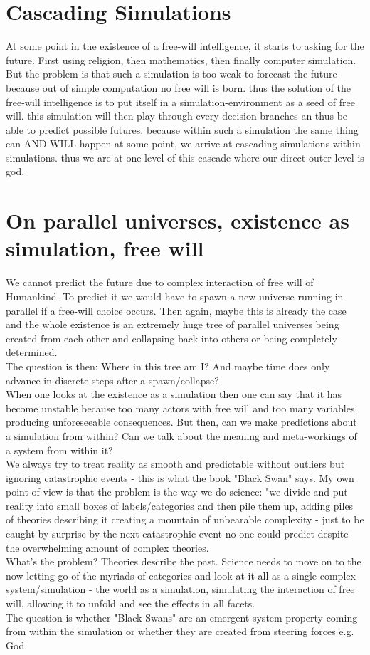 \documentclass{article}
\begin{document}
\section{Cascading Simulations}
At some point in the existence of a free-will intelligence, it starts to asking for the future. First using religion, then mathematics, then finally computer simulation. But the problem is that such a simulation is too weak to forecast the future because out of simple computation no free will is born. thus the solution of the free-will intelligence is to put itself in a simulation-environment as a seed of free will. this simulation will then play through every decision branches an thus be able to predict possible futures. because within such a simulation the same thing can AND WILL happen at some point, we arrive at cascading simulations within simulations. thus we are at one level of this cascade where our direct outer level is god.

\section{On parallel universes, existence as simulation, free will}
We cannot predict the future due to complex interaction of free will of Humankind. To predict it we would have to spawn a new universe running in parallel if a free-will choice occurs. Then again, maybe this is already the case and the whole existence is an extremely huge tree of parallel universes being created from each other and collapsing back into others or being completely determined. \\
The question is then: Where in this tree am I? And maybe time does only advance in discrete steps after a spawn/collapse? \\
When one looks at the existence as a simulation then one can say that it has become unstable because too many actors with free will and too many variables producing unforeseeable consequences. But then, can we make predictions about a simulation from within? Can we talk about the meaning and meta-workings of a system from within it? \\
We always try to treat reality as smooth and predictable without outliers but ignoring catastrophic events - this is what the book "Black Swan" says. My own point of view is that the problem is the way we do science: "we divide and put reality into small boxes of labels/categories and then pile them up, adding piles of theories describing it creating a mountain of unbearable complexity - just to be caught by surprise by the next catastrophic event no one could predict despite the overwhelming amount of complex theories. \\
What's the problem? Theories describe the past. Science needs to move on to the now letting go of the myriads of categories and look at it all as a single complex system/simulation - the world as a simulation, simulating the interaction of free will, allowing it to unfold and see the effects in all facets. \\
The question is whether "Black Swans" are an emergent system property coming from within the simulation or whether they are created from steering forces e.g. God.
\end{document}
